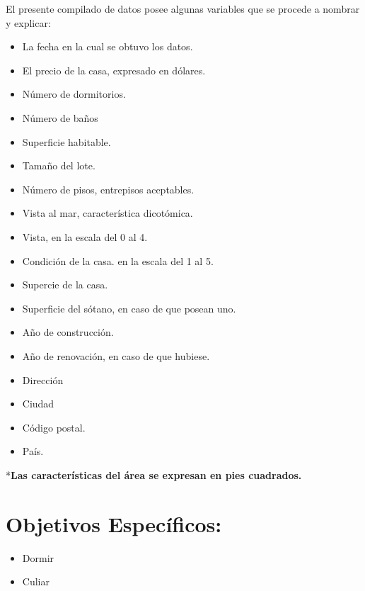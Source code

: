 \documentclass[
  oneside]{memoir}
\begin{document}
El presente compilado de datos posee algunas variables que se procede a
nombrar y explicar:

\begin{itemize}
\item {} La fecha en la cual se obtuvo los datos.
\item {} El precio de la casa, expresado en dólares.
\item {} Número de dormitorios.
\item {} Número de baños
\item {} Superficie habitable.
\item {} Tamaño del lote.
\item {} Número de pisos, entrepisos aceptables.
\item {} Vista al mar, característica dicotómica.
\item {} Vista, en la escala del 0 al 4.
\item {} Condición de la casa. en la escala del 1 al 5.
\item {} Supercie de la casa.
\item {} Superficie del sótano, en caso de que posean uno.
\item {} Año de construcción.
\item {} Año de renovación, en caso de que hubiese.
\item {} Dirección 
\item {} Ciudad 
\item {} Código postal.
\item {} País.
\end{itemize}

*\textbf{Las características del área se expresan en pies cuadrados.}

\section{Objetivos Específicos:}
 \begin{itemize} 
 \item Dormir

\item Culiar \citep{pinga}

\end{itemize}

\printbibliography

\backmatter
\end{document}
